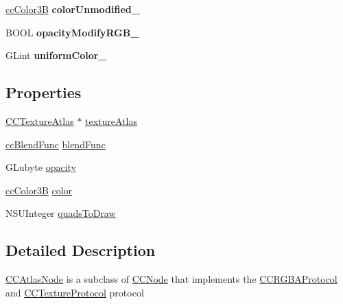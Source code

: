 \begin{DoxyCompactItemize}
\item 
\hypertarget{interface_c_c_atlas_node_a0fb1dc59667a4dd26a0d8695859ab121}{\hyperlink{cc_types_8h_a829b00c53e72f0115e3880cb508fec1e}{cc\-Color3\-B} {\bfseries color\-Unmodified\-\_\-}}\label{interface_c_c_atlas_node_a0fb1dc59667a4dd26a0d8695859ab121}

\item 
\hypertarget{interface_c_c_atlas_node_a577d29439e711969398c2602205a6d67}{B\-O\-O\-L {\bfseries opacity\-Modify\-R\-G\-B\-\_\-}}\label{interface_c_c_atlas_node_a577d29439e711969398c2602205a6d67}

\item 
\hypertarget{interface_c_c_atlas_node_a708e4eff72fa1863cf1599c2d7b42c98}{G\-Lint {\bfseries uniform\-Color\-\_\-}}\label{interface_c_c_atlas_node_a708e4eff72fa1863cf1599c2d7b42c98}

\end{DoxyCompactItemize}
\subsection*{Properties}
\begin{DoxyCompactItemize}
\item 
\hyperlink{interface_c_c_texture_atlas}{C\-C\-Texture\-Atlas} $\ast$ \hyperlink{interface_c_c_atlas_node_ad1cf740dfe711b0875533aef41afd507}{texture\-Atlas}
\item 
\hyperlink{cc_types_8h_a8c19c6f67219ecc0a6e4740cc046008d}{cc\-Blend\-Func} \hyperlink{interface_c_c_atlas_node_a95ccf1026e010ab1ed2577cf0e6a01cf}{blend\-Func}
\item 
G\-Lubyte \hyperlink{interface_c_c_atlas_node_affce9833612d523a1f3658dd40c08c1f}{opacity}
\item 
\hyperlink{cc_types_8h_a829b00c53e72f0115e3880cb508fec1e}{cc\-Color3\-B} \hyperlink{interface_c_c_atlas_node_af32feef5f87a1163f6f432bf524227e9}{color}
\item 
N\-S\-U\-Integer \hyperlink{interface_c_c_atlas_node_aef4af546b58afdaa2d75cac3ee7d60fe}{quads\-To\-Draw}
\end{DoxyCompactItemize}


\subsection{Detailed Description}
\hyperlink{interface_c_c_atlas_node}{C\-C\-Atlas\-Node} is a subclass of \hyperlink{class_c_c_node}{C\-C\-Node} that implements the \hyperlink{protocol_c_c_r_g_b_a_protocol-p}{C\-C\-R\-G\-B\-A\-Protocol} and \hyperlink{protocol_c_c_texture_protocol-p}{C\-C\-Texture\-Protocol} protocol

